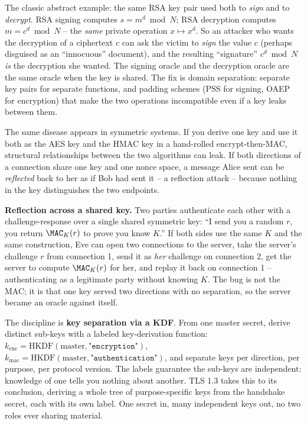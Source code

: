 \begin{whybox}
The classic abstract example: the same RSA key pair used both to \emph{sign} and to \emph{decrypt}. RSA signing computes $s = m^d \bmod N$; RSA decryption computes $m = c^d \bmod N$ -- the \emph{same} private operation $x \mapsto x^d$. So an attacker who wants the decryption of a ciphertext $c$ can ask the victim to \emph{sign} the value $c$ (perhaps disguised as an ``innocuous'' document), and the resulting ``signature'' $c^d \bmod N$ \emph{is} the decryption she wanted. The signing oracle and the decryption oracle are the same oracle when the key is shared. The fix is domain separation: separate key pairs for separate functions, and padding schemes (PSS for signing, OAEP for encryption) that make the two operations incompatible even if a key leaks between them.
\end{whybox}

The same disease appears in symmetric systems. If you derive one key and use it both as the AES key and the HMAC key in a hand-rolled encrypt-then-MAC, structural relationships between the two algorithms can leak. If both directions of a connection share one key and one nonce space, a message Alice sent can be \emph{reflected} back to her as if Bob had sent it -- a reflection attack -- because nothing in the key distinguishes the two endpoints.

\begin{attackbox}
\textbf{Reflection across a shared key.} Two parties authenticate each other with a challenge-response over a single shared symmetric key: ``I send you a random $r$, you return $\MAC_K(r)$ to prove you know $K$.'' If both sides use the same $K$ and the same construction, Eve can open two connections to the server, take the server's challenge $r$ from connection 1, send it as \emph{her} challenge on connection 2, get the server to compute $\MAC_K(r)$ for her, and replay it back on connection 1 -- authenticating as a legitimate party without knowing $K$. The bug is not the MAC; it is that one key served two directions with no separation, so the server became an oracle against itself.
\end{attackbox}

\begin{focusbox}
The discipline is \textbf{key separation via a KDF}. From one master secret, derive distinct sub-keys with a labeled key-derivation function: $k_{\text{enc}} = \mathrm{HKDF}(\text{master}, \texttt{"encryption"})$, $k_{\text{mac}} = \mathrm{HKDF}(\text{master}, \texttt{"authentication"})$, and separate keys per direction, per purpose, per protocol version. The labels guarantee the sub-keys are independent: knowledge of one tells you nothing about another. TLS 1.3 takes this to its conclusion, deriving a whole tree of purpose-specific keys from the handshake secret, each with its own label. One secret in, many independent keys out, no two roles ever sharing material.
\end{focusbox}

